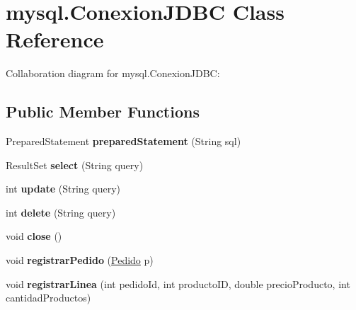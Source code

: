 \hypertarget{classmysql_1_1_conexion_j_d_b_c}{}\section{mysql.\+Conexion\+J\+D\+BC Class Reference}
\label{classmysql_1_1_conexion_j_d_b_c}


Collaboration diagram for mysql.\+Conexion\+J\+D\+BC\+:
\subsection*{Public Member Functions}
\begin{DoxyCompactItemize}
\item 
\mbox{\label{classmysql_1_1_conexion_j_d_b_c_a342d326d6f6c9831bb117afccb912a04}} 
Prepared\+Statement {\bfseries prepared\+Statement} (String sql)
\item 
\mbox{\label{classmysql_1_1_conexion_j_d_b_c_a77f0c70a90a3e174114586b131f10909}} 
Result\+Set {\bfseries select} (String query)
\item 
\mbox{\label{classmysql_1_1_conexion_j_d_b_c_a5a0abe91b83748401d0a630817c15e83}} 
int {\bfseries update} (String query)
\item 
\mbox{\label{classmysql_1_1_conexion_j_d_b_c_a7cb683b19298ad4ccda2ef51abb68302}} 
int {\bfseries delete} (String query)
\item 
\mbox{\label{classmysql_1_1_conexion_j_d_b_c_a05e552aeb511582e81c6dd6cba120182}} 
void {\bfseries close} ()
\item 
\mbox{\label{classmysql_1_1_conexion_j_d_b_c_a6d8f0cd0e2046952d9771d379c16562a}} 
void {\bfseries registrar\+Pedido} (\mbox{\hyperlink{classobjetos_1_1_pedido}{Pedido}} p)
\item 
\mbox{\label{classmysql_1_1_conexion_j_d_b_c_ab41e6e25d89ab9a807e9729fcdf5818f}} 
void {\bfseries registrar\+Linea} (int pedido\+Id, int producto\+ID, double precio\+Producto, int cantidad\+Productos)

\end{DoxyCompactItemize}

